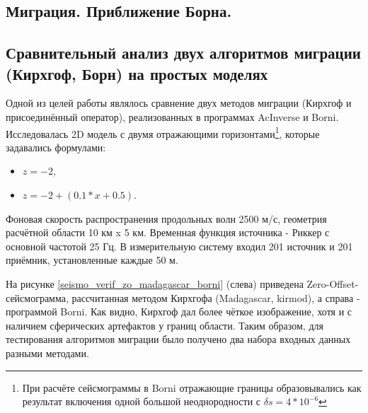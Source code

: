 \documentclass{article}
\begin{document}
\subsection{Миграция. Приближение Борна.}


\subsection{Сравнительный анализ двух алгоритмов миграции (Кирхгоф, Борн) на простых моделях}

Одной из целей работы являлось сравнение двух методов миграции (Кирхгоф и присоединённый оператор), реализованных в программах AcInverse и Borni.
Исследовалась 2D модель с двумя отражающими горизонтами\footnote{При расчёте сейсмограммы в Borni отражающие границы образовывались как результат включения одной большой неоднородности с $\delta s = 4*10^{-6}$}, которые задавались формулами:
\begin{itemize}
\item $z=-2$,
\item $z=-2 + (0.1 * x + 0.5)$.
\end{itemize}
Фоновая скорость распространения продольных волн 2500 м/с, геометрия расчётной области 10 км x 5 км.
Временная функция источника - Риккер с основной частотой 25 Гц.
В измерительную систему входил 201 источник и 201 приёмник, установленные каждые 50 м.

На рисунке \ref{seismo_verif_zo_madagascar_borni} (слева) приведена Zero-Offset-сейсмограмма, рассчитанная методом Кирхгофа (Madagascar, kirmod), а справа - программой Borni.
Как видно, Кирхгоф дал более чёткое изображение, хотя и с наличием сферических артефактов у границ области.
Таким образом, для тестирования алгоритмов миграции было получено два набора входных данных разными методами.
\end{document}
